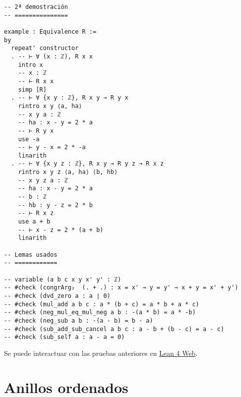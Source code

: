 \begin{verbatim}
-- 2ª demostración
-- ===============

example : Equivalence R :=
by
  repeat' constructor
  . -- ⊢ ∀ (x : ℤ), R x x
    intro x
    -- x : ℤ
    -- ⊢ R x x
    simp [R]
  . -- ⊢ ∀ {x y : ℤ}, R x y → R y x
    rintro x y ⟨a, ha⟩
    -- x y a : ℤ
    -- ha : x - y = 2 * a
    -- ⊢ R y x
    use -a
    -- ⊢ y - x = 2 * -a
    linarith
  . -- ⊢ ∀ {x y z : ℤ}, R x y → R y z → R x z
    rintro x y z ⟨a, ha⟩ ⟨b, hb⟩
    -- x y z a : ℤ
    -- ha : x - y = 2 * a
    -- b : ℤ
    -- hb : y - z = 2 * b
    -- ⊢ R x z
    use a + b
    -- ⊢ x - z = 2 * (a + b)
    linarith

-- Lemas usados
-- ============

-- variable (a b c x y x' y' : ℤ)
-- #check (congrArg₂  (. + .) : x = x' → y = y' → x + y = x' + y')
-- #check (dvd_zero a : a ∣ 0)
-- #check (mul_add a b c : a * (b + c) = a * b + a * c)
-- #check (neg_mul_eq_mul_neg a b : -(a * b) = a * -b)
-- #check (neg_sub a b : -(a - b) = b - a)
-- #check (sub_add_sub_cancel a b c : a - b + (b - c) = a - c)
-- #check (sub_self a : a - a = 0)
\end{verbatim}
Se puede interactuar con las pruebas anteriores en \href{https://lean.math.hhu.de/\#url=https://raw.githubusercontent.com/jaalonso/Calculemus2/main/src/La\_congruencia\_modulo\_2\_es\_una\_relacion\_de\_equivalencia.lean}{Lean 4 Web}.

\chapter{Anillos ordenados}
\label{sec:org1c6d50d}

